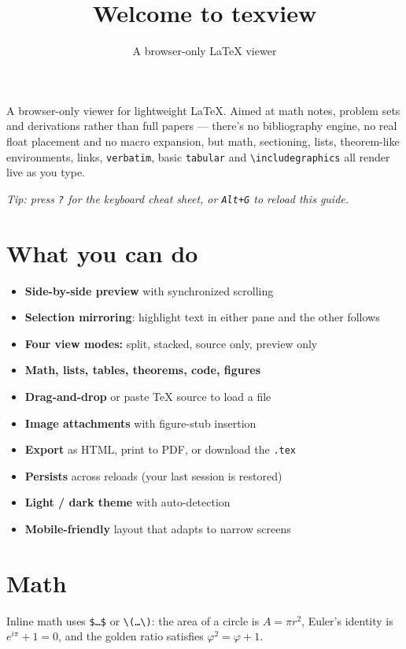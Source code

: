\documentclass{article}
\title{Welcome to texview}
\author{A browser-only LaTeX viewer}
\date{}
\begin{document}
\maketitle

A browser-only viewer for lightweight LaTeX. Aimed at math notes, problem
sets and derivations rather than full papers --- there's no bibliography
engine, no real float placement and no macro expansion, but math,
sectioning, lists, theorem-like environments, links, \texttt{verbatim},
basic \texttt{tabular} and \texttt{\textbackslash includegraphics} all
render live as you type.

\textit{Tip: press \texttt{?} for the keyboard cheat sheet, or
\texttt{Alt+G} to reload this guide.}

\section{What you can do}

\begin{itemize}
  \item \textbf{Side-by-side preview} with synchronized scrolling
  \item \textbf{Selection mirroring}: highlight text in either pane and
        the other follows
  \item \textbf{Four view modes:} split, stacked, source only, preview only
  \item \textbf{Math, lists, tables, theorems, code, figures}
  \item \textbf{Drag-and-drop} or paste TeX source to load a file
  \item \textbf{Image attachments} with figure-stub insertion
  \item \textbf{Export} as HTML, print to PDF, or download the \texttt{.tex}
  \item \textbf{Persists} across reloads (your last session is restored)
  \item \textbf{Light / dark theme} with auto-detection
  \item \textbf{Mobile-friendly} layout that adapts to narrow screens
\end{itemize}

\section{Math}

Inline math uses \texttt{\$\dots\$} or \texttt{\textbackslash(\dots\textbackslash)}:
the area of a circle is $A = \pi r^2$, Euler's identity is
$e^{i\pi} + 1 = 0$, and the golden ratio satisfies
$\varphi^2 = \varphi + 1$.
\end{document}
